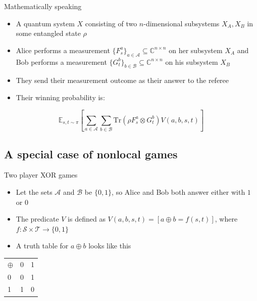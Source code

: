 \begin{frame}{Mathematically speaking}
\begin{itemize}
    \item A quantum system $X$ consisting of two $n$-dimensional subsystems $X_A, X_B$ in some entangled state $\rho$
    \item Alice performs a measurement $\{ F_s^a \}_{a\in \mathcal{A}}\subseteq \mathbb{C}^{n \times n}$ on her subsystem $X_A$ and Bob performs a measurement $\{ G_t^b\}_{b \in \mathcal{B}} \subseteq \mathbb{C}^{n \times n}$ on his subsystem $X_B$
    \item They send their measurement outcome as their answer to the referee
    \item Their winning probability is:
\end{itemize}
\begin{equation*}
\mathbb{E}_{s,t \sim \pi} \left[ \sum_{a \in \mathcal{A}} \sum_{b \in \mathcal{B}} \text{Tr}(\rho F_s^a \otimes G_t^b) V(a,b,s,t) \right]
\end{equation*}  
\end{frame}

\subsection{A special case of nonlocal games}
\begin{frame}{Two player XOR games}
\begin{itemize}
    \item Let the sets $\mathcal{A}$ and $\mathcal{B}$ be $\{0,1\}$, so Alice and Bob both answer either with $1$ or $0$
    \item The predicate $V$ is defined as $V(a,b,s,t) = [ a\oplus b = f(s,t)]$, where $f: \mathcal{S} \times \mathcal{T} \rightarrow \{0,1\}$
    \item A truth table for $a \oplus b$ looks like this
\end{itemize}
    \begin{center}
\begin{tabular}{l | c r }
$\oplus$ & 0 & 1 \\
\cline{1-3} 

0 & 0 & 1 \\
1 & 1 & 0 
\end{tabular}\\
\end{center}
\end{frame}

